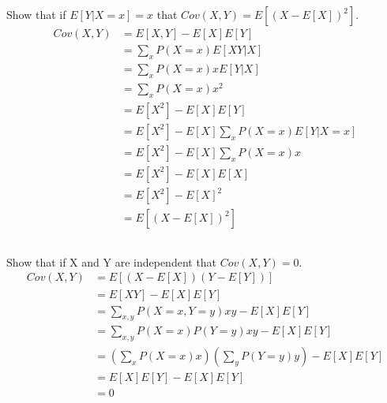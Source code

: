 \section{}

\subsection{}

Show that if $E[Y|X=x]=x$ that $Cov(X, Y) = E[(X - E[X])^2]$.
\begin{align*}
    Cov(X, Y) &= E[X, Y] - E[X]E[Y] \\
	&= \sum_x P(X=x) E[XY | X] \\
	&= \sum_x P(X=x) x E[Y | X] \\
	&= \sum_x P(X=x) x^2 \tag*{Law of total expectation}\\
	&= E[X^2] - E[X]E[Y] \\
	&= E[X^2] - E[X] \sum_x P(X=x) E[Y | X=x] \\
	&= E[X^2] - E[X] \sum_x P(X=x) x \\
	&= E[X^2] - E[X]E[X] \tag*{Law of total expectation} \\
	&= E[X^2] - E[X]^2 \\
	&= E[(X - E[X])^2]
\end{align*}

\subsection{}

Show that if X and Y are independent that $Cov(X, Y) = 0$.
\begin{align*}
Cov(X,Y)
    &= E[(X - E[X])(Y - E[Y])] \\
    &= E[XY] - E[X]E[Y] \\
    &= \sum_{x,y}P(X=x, Y=y) xy  - E[X]E[Y] \\
    &= \sum_{x,y}P(X=x)P(Y=y) xy  - E[X]E[Y] \\
    &= (\sum_x P(X=x) x) (\sum_y P(Y=y) y) - E[X]E[Y] \\
    &= E[X]E[Y] - E[X]E[Y] \\
    &= 0 \\ 
\end{align*}
